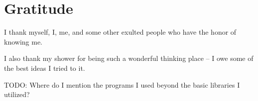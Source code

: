 \section*{Gratitude}

I thank myself, I, me, and some other exulted people who have the honor of knowing me.

I also thank my shower for being such a wonderful thinking place – I owe some of the best ideas I tried to it.

TODO: Where do I mention the programs I used beyond the basic libraries I utilized?
